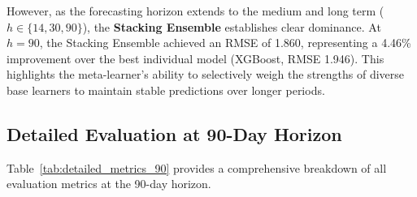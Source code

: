 However, as the forecasting horizon extends to the medium and long term ($h \in \{14, 30, 90\}$), the \textbf{Stacking Ensemble} establishes clear dominance. At $h=90$, the Stacking Ensemble achieved an RMSE of 1.860, representing a 4.46\% improvement over the best individual model (XGBoost, RMSE 1.946). This highlights the meta-learner's ability to selectively weigh the strengths of diverse base learners to maintain stable predictions over longer periods.

\subsection{Detailed Evaluation at 90-Day Horizon}

Table~\ref{tab:detailed_metrics_90} provides a comprehensive breakdown of all evaluation metrics at the 90-day horizon. 

\begin{table}[htbp]
\centering
\caption{Detailed evaluation metrics at the long-term forecast horizon ($h=90$).}
\label{tab:detailed_metrics_90}
\end{table}

